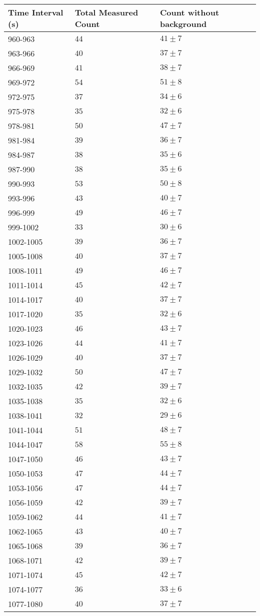 \begin{tabular}{| p{} | p{} | p{} |}\hline
Time Interval (s) & Total Measured Count & Count without background\\
\hline
960-963 & $44$ & $41\pm 7$\\
963-966 & $40$ & $37\pm 7$\\
966-969 & $41$ & $38\pm 7$\\
969-972 & $54$ & $51\pm 8$\\
972-975 & $37$ & $34\pm 6$\\
975-978 & $35$ & $32\pm 6$\\
978-981 & $50$ & $47\pm 7$\\
981-984 & $39$ & $36\pm 7$\\
984-987 & $38$ & $35\pm 6$\\
987-990 & $38$ & $35\pm 6$\\
990-993 & $53$ & $50\pm 8$\\
993-996 & $43$ & $40\pm 7$\\
996-999 & $49$ & $46\pm 7$\\
999-1002 & $33$ & $30\pm 6$\\
1002-1005 & $39$ & $36\pm 7$\\
1005-1008 & $40$ & $37\pm 7$\\
1008-1011 & $49$ & $46\pm 7$\\
1011-1014 & $45$ & $42\pm 7$\\
1014-1017 & $40$ & $37\pm 7$\\
1017-1020 & $35$ & $32\pm 6$\\
1020-1023 & $46$ & $43\pm 7$\\
1023-1026 & $44$ & $41\pm 7$\\
1026-1029 & $40$ & $37\pm 7$\\
1029-1032 & $50$ & $47\pm 7$\\
1032-1035 & $42$ & $39\pm 7$\\
1035-1038 & $35$ & $32\pm 6$\\
1038-1041 & $32$ & $29\pm 6$\\
1041-1044 & $51$ & $48\pm 7$\\
1044-1047 & $58$ & $55\pm 8$\\
1047-1050 & $46$ & $43\pm 7$\\
1050-1053 & $47$ & $44\pm 7$\\
1053-1056 & $47$ & $44\pm 7$\\
1056-1059 & $42$ & $39\pm 7$\\
1059-1062 & $44$ & $41\pm 7$\\
1062-1065 & $43$ & $40\pm 7$\\
1065-1068 & $39$ & $36\pm 7$\\
1068-1071 & $42$ & $39\pm 7$\\
1071-1074 & $45$ & $42\pm 7$\\
1074-1077 & $36$ & $33\pm 6$\\
1077-1080 & $40$ & $37\pm 7$\\
\hline
\end{tabular}\quad
